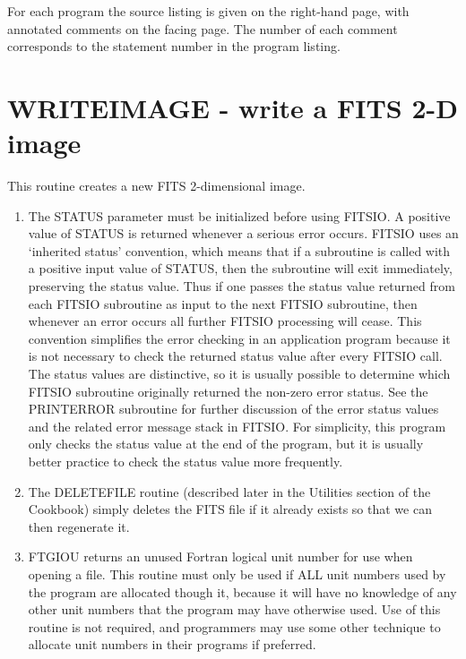 For each program the source listing is given on the right-hand page,
with annotated comments on the facing page.   The number of each
comment corresponds to the statement number in the program listing.

\newpage
\section{WRITEIMAGE - write a FITS 2-D image}

This routine creates a new FITS 2-dimensional image.

\begin{enumerate}
\item
The STATUS parameter must be initialized before using FITSIO.  A
positive value of STATUS is returned whenever a serious error occurs.
FITSIO uses an `inherited status' convention, which means that if a
subroutine is called with a positive input value of STATUS, then the
subroutine will exit immediately, preserving the status value.  Thus if
one passes the status value returned from each FITSIO subroutine as
input to the next FITSIO subroutine, then whenever an error occurs all
further FITSIO processing will cease.  This convention simplifies the
error checking in an application program because it is not necessary to
check the returned status value after every FITSIO call.  The status
values are distinctive, so it is usually possible to determine which
FITSIO subroutine originally returned the non-zero error status.  See
the PRINTERROR subroutine for further discussion of the error status
values and the related error message stack in FITSIO.  For simplicity,
this program only checks the status value at the end of the program,
but it is usually better practice to check the status value more
frequently.

\item
The DELETEFILE routine (described later in the Utilities section of the
Cookbook) simply deletes the FITS file if it already exists so that we
can then regenerate it.

\item
FTGIOU returns an unused Fortran logical unit number for use when
opening a file.  This routine must only be used if ALL unit numbers
used by the program are allocated though it, because it will have no
knowledge of any other unit numbers that the program may have
otherwise used.  Use of this routine is not required, and programmers
may use some other technique to allocate unit numbers in their programs
if preferred.


\end{enumerate}
